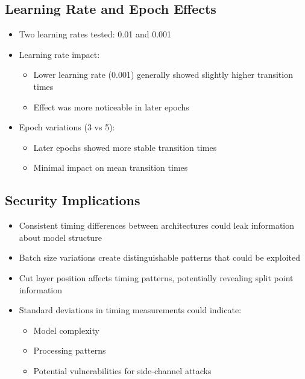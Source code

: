 \documentclass[10pt]{article}
\begin{document}
\subsection{Learning Rate and Epoch Effects}
\begin{itemize}
    \item Two learning rates tested: 0.01 and 0.001
    \item Learning rate impact:
        \begin{itemize}
            \item Lower learning rate (0.001) generally showed slightly higher transition times
            \item Effect was more noticeable in later epochs
        \end{itemize}
    \item Epoch variations (3 vs 5):
        \begin{itemize}
            \item Later epochs showed more stable transition times
            \item Minimal impact on mean transition times
        \end{itemize}
\end{itemize}

\subsection{Security Implications}
\begin{itemize}
    \item Consistent timing differences between architectures could leak information about model structure
    \item Batch size variations create distinguishable patterns that could be exploited
    \item Cut layer position affects timing patterns, potentially revealing split point information
    \item Standard deviations in timing measurements could indicate:
        \begin{itemize}
            \item Model complexity
            \item Processing patterns
            \item Potential vulnerabilities for side-channel attacks
        \end{itemize}
\end{itemize}
\end{document}
